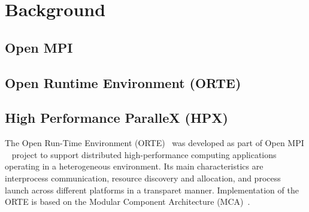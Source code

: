 \chapter{Background}
\label{sec:Background}

\section{Open MPI}
\label{sec:Background}


\section{Open Runtime Environment (ORTE)}
\label{sec:Background}


\section{High Performance ParalleX (HPX)}
\label{sec:Background}



The Open Run-Time Environment (ORTE)~\cite{Castain2008153} was developed as part of Open MPI
~\cite{gabriel04:_open_mpi} project to support distributed high-performance computing
applications operating in a heterogeneous environment. Its main 
characteristics are interprocess communication, resource discovery and
allocation, and process launch across different platforms in a transparet manner.
Implementation of the ORTE is based on the Modular Component Architecture 
(MCA)~\cite{gabriel04:_open_mpi}.

